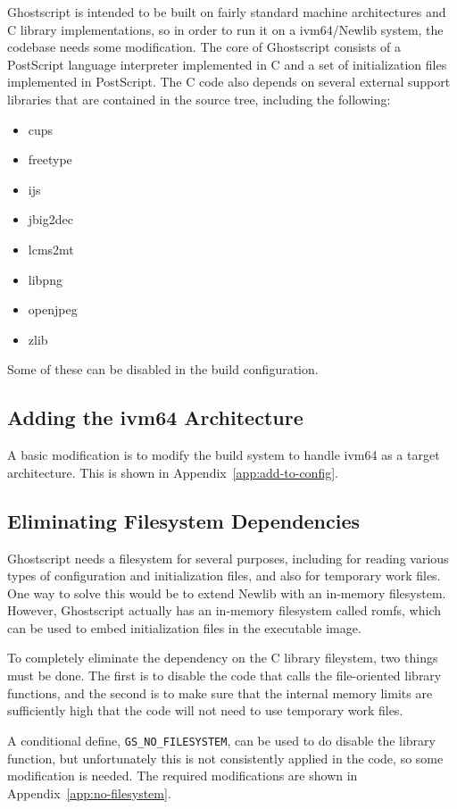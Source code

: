 \documentclass[a4paper,11pt]{article}
\begin{document}
Ghostscript is intended to be built on fairly standard machine architectures and C library implementations, so in order to run it on a ivm64/Newlib system, the codebase needs some modification.
The core of Ghostscript consists of a PostScript language interpreter implemented in C and a set of initialization files implemented in PostScript.
The C code also depends on several external support libraries that are contained in the source tree, including the following:
\begin{itemize}
\item cups
\item freetype
\item ijs
\item jbig2dec
\item lcms2mt
\item libpng
\item openjpeg
\item zlib
\end{itemize}
Some of these can be disabled in the build configuration.

\subsection{Adding the ivm64 Architecture}

A basic modification is to modify the build system to handle ivm64 as a target architecture.
This is shown in Appendix~\ref{app:add-to-config}.

\subsection{Eliminating Filesystem Dependencies}

Ghostscript needs a filesystem for several purposes, including for reading various types of configuration and initialization files, and also for temporary work files.
One way to solve this would be to extend Newlib with an in-memory filesystem.
However, Ghostscript actually has an in-memory filesystem called romfs, which can be used to embed initialization files in the executable image.

To completely eliminate the dependency on the C library fileystem, two things must be done.
The first is to disable the code that calls the file-oriented library functions, and the second is to make sure that the internal memory limits are sufficiently high that the code will not need to use temporary work files.

A conditional define, \texttt{GS\_NO\_FILESYSTEM}, can be used to do disable the library function, but unfortunately this is not consistently applied in the code, so some modification is needed.
The required modifications are shown in Appendix~\ref{app:no-filesystem}.
\end{document}
